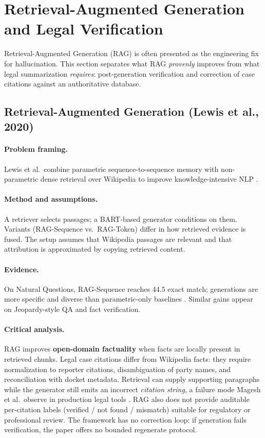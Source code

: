 \section{Retrieval-Augmented Generation and Legal Verification}
\label{sec:lit-rag}

Retrieval-Augmented Generation (RAG) is often presented as the engineering fix for hallucination. This section separates what RAG \emph{provenly} improves from what legal summarization \emph{requires}: post-generation verification and correction of case citations against an authoritative database.

\subsection{Retrieval-Augmented Generation (Lewis et al., 2020)}
\label{sec:lit-rag-lewis}

\paragraph{Problem framing.}
Lewis et al.\ combine parametric sequence-to-sequence memory with non-parametric dense retrieval over Wikipedia to improve knowledge-intensive NLP \cite{lewis2020rag}.

\paragraph{Method and assumptions.}
A retriever selects passages; a BART-based generator conditions on them. Variants (RAG-Sequence vs.\ RAG-Token) differ in how retrieved evidence is fused. The setup assumes that Wikipedia passages are relevant and that attribution is approximated by copying retrieved content.

\paragraph{Evidence.}
On Natural Questions, RAG-Sequence reaches 44.5 exact match; generations are more specific and diverse than parametric-only baselines \cite{lewis2020rag}. Similar gains appear on Jeopardy-style QA and fact verification.

\paragraph{Critical analysis.}
RAG improves \textbf{open-domain factuality} when facts are locally present in retrieved chunks. Legal case citations differ from Wikipedia facts: they require normalization to reporter citations, disambiguation of party names, and reconciliation with docket metadata. Retrieval can supply supporting paragraphs while the generator still emits an incorrect \emph{citation string}, a failure mode Magesh et al.\ observe in production legal tools \cite{magesh2025hallucinationfree}. RAG also does not provide auditable per-citation labels (verified / not found / mismatch) suitable for regulatory or professional review. The framework has no correction loop: if generation fails verification, the paper offers no bounded regenerate protocol.

